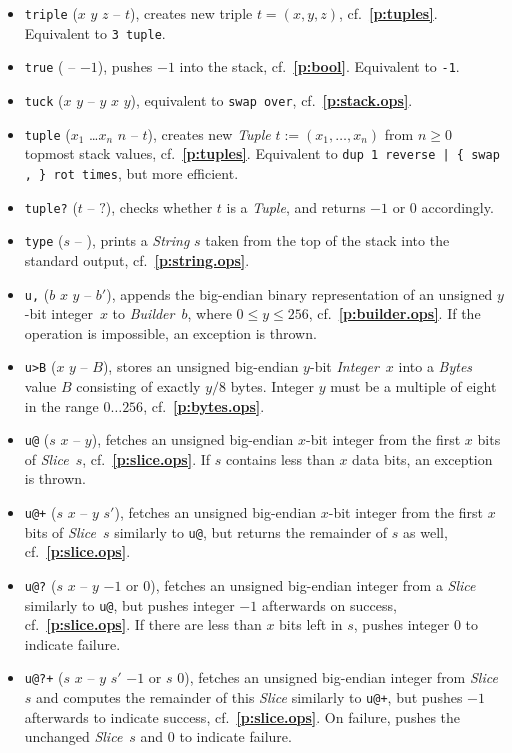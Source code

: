 \documentclass[12pt,oneside]{article}
\def\refpoint#1{{\rm\textbf{\ref{#1}}}}
\let\ptref=\refpoint
\begin{document}
\begin{itemize}
\item {\tt triple} ($x$ $y$ $z$ -- $t$), creates new triple $t=(x,y,z)$, cf.~\ptref{p:tuples}. Equivalent to {\tt 3 tuple}.
\item {\tt true} ( -- $-1$), pushes $-1$ into the stack, cf.~\ptref{p:bool}. Equivalent to {\tt -1}.
\item {\tt tuck} ($x$ $y$ -- $y$ $x$ $y$), equivalent to {\tt swap over}, cf.~\ptref{p:stack.ops}.
\item {\tt tuple} ($x_1$ \dots $x_n$ $n$ -- $t$), creates new {\em Tuple\/} $t:=(x_1,\ldots,x_n)$ from $n\geq0$ topmost stack values, cf.~\ptref{p:tuples}. Equivalent to {\tt dup 1 reverse | \{ swap , \} rot times}, but more efficient.
\item {\tt tuple?} ($t$ -- $?$), checks whether $t$ is a {\em Tuple}, and returns $-1$ or $0$ accordingly.
\item {\tt type} ($s$ -- ), prints a {\em String\/} $s$ taken from the top of the stack into the standard output, cf.~\ptref{p:string.ops}.
\item {\tt u,} ($b$ $x$ $y$ -- $b'$), appends the big-endian binary representation of an unsigned $y$-bit integer~$x$ to {\em Builder\/}~$b$, where $0\leq y\leq 256$, cf.~\ptref{p:builder.ops}. If the operation is impossible, an exception is thrown.
\item {\tt u>B} ($x$ $y$ -- $B$), stores an unsigned big-endian $y$-bit {\em Integer\/}~$x$ into a {\em Bytes\/} value $B$ consisting of exactly $y/8$ bytes. Integer $y$ must be a multiple of eight in the range $0\ldots256$, cf.~\ptref{p:bytes.ops}.
\item {\tt u@} ($s$ $x$ -- $y$), fetches an unsigned big-endian $x$-bit integer from the first $x$ bits of {\em Slice}~$s$, cf.~\ptref{p:slice.ops}. If $s$ contains less than $x$ data bits, an exception is thrown.
\item {\tt u@+} ($s$ $x$ -- $y$ $s'$), fetches an unsigned big-endian $x$-bit integer from the first $x$ bits of {\em Slice}~$s$ similarly to {\tt u@}, but returns the remainder of $s$ as well, cf.~\ptref{p:slice.ops}.
\item {\tt u@?} ($s$ $x$ -- $y$ $-1$ or $0$), fetches an unsigned big-endian integer from a {\em Slice\/} similarly to {\tt u@}, but pushes integer $-1$ afterwards on success, cf.~\ptref{p:slice.ops}. If there are less than $x$ bits left in $s$, pushes integer $0$ to indicate failure.
\item {\tt u@?+} ($s$ $x$ -- $y$ $s'$ $-1$ or $s$ $0$), fetches an unsigned big-endian integer from {\em Slice\/}~$s$ and computes the remainder of this {\em Slice\/} similarly to {\tt u@+}, but pushes $-1$ afterwards to indicate success, cf.~\ptref{p:slice.ops}. On failure, pushes the unchanged {\em Slice\/}~$s$ and $0$ to indicate failure.

\end{itemize}
\end{document}
